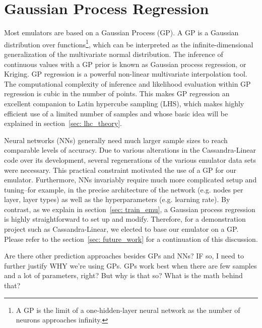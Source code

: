 
\section{Gaussian Process Regression}
\label{sec: gpr_intro}


Most emulators are based on a Gaussian Process (GP). A GP is a Gaussian
distribution over functions\footnote
{A GP is the limit of a one-hidden-layer neural network as the number of
neurons approaches infinity.}, which can be interpreted
as the infinite-dimensional generalization of the multivariate normal
distribution. The inference of continuous values with a GP prior
is known as Gaussian process regression, or Kriging. GP regression is a
powerful non-linear multivariate interpolation tool. The computational
complexity of inference and likelihood evaluation within GP regression is cubic
in the number of points. This makes GP regression an excellent companion to
Latin hypercube sampling (LHS), which makes highly efficient use of a limited 
number of samples and whose basic idea will be explained in section~\ref{sec:
lhc_theory}.

Neural networks (NNs) generally need much larger sample sizes to reach
comparable levels of
accuracy. Due to various alterations in the Cassandra-Linear code over its
development, several regenerations of the various emulator data sets were
necessary. This practical constraint motivated the use of a GP for our
emulator. Furthermore, NNs invariably require much more complicated setup and
tuning--for example, in the precise architecture of the network (e.g. nodes
per layer, layer types) as well as the hyperparameters (e.g. learning rate).
By contrast, as we explain in section~\ref{sec: train_emu}, a Gaussian
process regression is highly straightforward to set up and modify. Therefore,
for a demonstration project such as Cassandra-Linear, we elected to base our
emulator on a GP. Please refer to the section~\ref{sec: future_work} for a
continuation of this discussion.

Are there other prediction approaches besides GPs and NNs? IF so, I need to
further justify WHY we’re using GPs.
GPs work best when there are few samples and a lot of parameters, right?
But why is that so? What is the math behind that?


